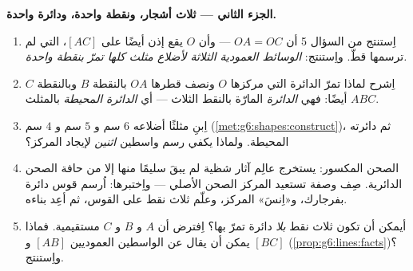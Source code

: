 \begin{problem}
\medskip
\noindent\textbf{الجزء الثاني --- ثلاث أشجار، ونقطة واحدة،
ودائرة واحدة.}
\begin{enumerate}[resume]
  \item اِستنتج من السؤال 5 أن $OA = OC$ --- وأن
        $O$ يقع إذن أيضًا على  
        $[AC]$، التي لم ترسمها قطّ. واِستنتج: \emph{الوسائط
        العمودية الثلاثة لأضلاع مثلث كلها
        تمرّ بنقطة واحدة.}
  \item اِشرح لماذا تمرّ الدائرة التي مركزها $O$ ونصف قطرها $OA$
        بالنقطة $B$ وبالنقطة $C$ أيضًا: فهي \emph{الدائرة}
        المارّة بالنقط الثلاث --- أي \emph{الدائرة
        المحيطة}
        بالمثلث $ABC$.
  \item اِبنِ مثلثًا أضلاعه $6$ سم و $5$ سم و
        $4$ سم (\cref{met:g6:shapes:construct})، ثم
        دائرته المحيطة. ولماذا يكفي رسم
        واسطين \emph{اثنين} لإيجاد المركز؟
  \item الصحن المكسور: يستخرج عالِم آثار شظية لم يبقَ
        سليمًا منها إلا  من حافة الصحن الدائرية.
        صِف وصفة تستعيد المركز  الصحن الأصلي --- واِختبرها: اُرسم
        قوس دائرة بفرجارك، و«اِنسَ» المركز،
        وعلّم ثلاث نقط على القوس، ثم أعِد بناءه.
  \item أيمكن أن تكون ثلاث نقط \emph{بلا} دائرة تمرّ
        بها؟ اِفترض أن $A$ و $B$ و $C$ مستقيمية. فماذا يمكن
        أن يقال عن الواسطين العموديين  $[AB]$ و
        $[BC]$ (\cref{prop:g6:lines:facts})؟ واِستنتج.
\end{enumerate}


\end{problem}
